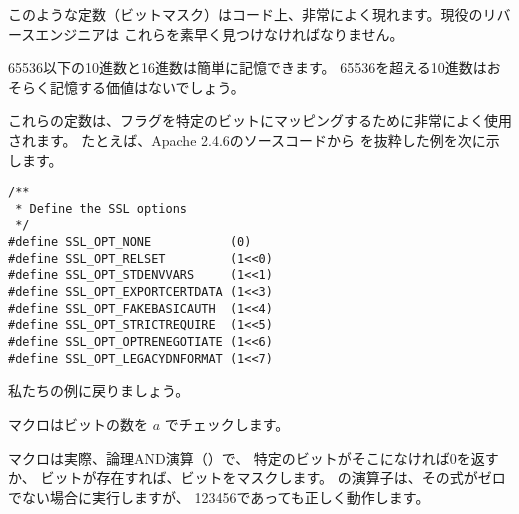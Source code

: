 このような定数（ビットマスク）はコード上、非常によく現れます。現役のリバースエンジニアは
これらを素早く見つけなければなりません。

65536以下の10進数と16進数は簡単に記憶できます。
65536を超える10進数はおそらく記憶する価値はないでしょう。

これらの定数は、フラグを特定のビットにマッピングするために非常によく使用されます。
たとえば、Apache 2.4.6のソースコードから
を抜粋した例を次に示します。

\begin{lstlisting}[style=customc]
/**
 * Define the SSL options
 */
#define SSL_OPT_NONE           (0)
#define SSL_OPT_RELSET         (1<<0)
#define SSL_OPT_STDENVVARS     (1<<1)
#define SSL_OPT_EXPORTCERTDATA (1<<3)
#define SSL_OPT_FAKEBASICAUTH  (1<<4)
#define SSL_OPT_STRICTREQUIRE  (1<<5)
#define SSL_OPT_OPTRENEGOTIATE (1<<6)
#define SSL_OPT_LEGACYDNFORMAT (1<<7)
\end{lstlisting}

私たちの例に戻りましょう。

マクロはビットの数を $a$ でチェックします。

マクロは実際、論理AND演算（）で、
特定のビットがそこになければ0を返すか、
ビットが存在すれば、ビットをマスクします。
\CCpp の演算子は、その式がゼロでない場合に実行しますが、
123456であっても正しく動作します。





